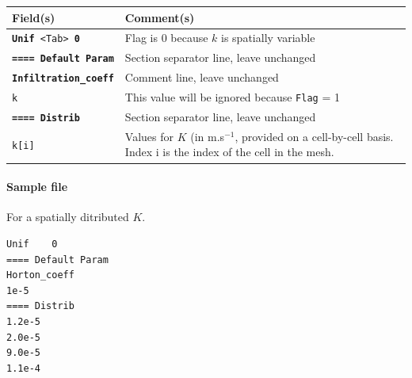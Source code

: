     \begin{tabular}{p{6cm} | p{9cm}}
    \hline
    Field(s) & Comment(s) \\
    \hline  \hline
    \texttt{\textbf{Unif} <Tab> \textbf{0}} & Flag is 0 because $k$ is spatially variable \\ 
    \hline
    \texttt{\textbf{==== Default Param}} & Section separator line, leave unchanged \\ 
    \hline
    \texttt{\textbf{Infiltration\_coeff}} & Comment line, leave unchanged \\ 
    \hline
    \texttt{k}     & This value will be ignored because \texttt{Flag} = 1 \\ 
    \hline
    \texttt{\textbf{==== Distrib}} & Section separator line, leave unchanged \\  
    \hline
    \texttt{k[i]}      & Values for $K$ (in m.s$^{-1}$, provided on a cell-by-cell basis. Index i is the index of the cell in the mesh.  \\ 
    \hline
    \end{tabular}

\paragraph*{Sample file}
For a spatially ditributed $K$.

\begin{verbatim}
Unif	0
==== Default Param
Horton_coeff
1e-5
==== Distrib
1.2e-5
2.0e-5
9.0e-5
1.1e-4
\end{verbatim}